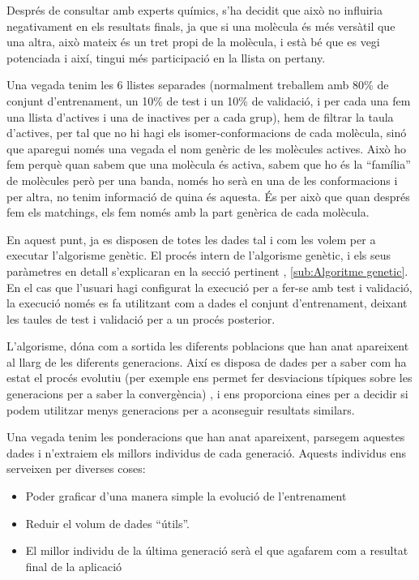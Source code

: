 Després de consultar amb experts químics, s'ha decidit que això no influiria
negativament en els resultats finals, ja que si una molècula és més versàtil que
una altra, això mateix és un tret propi de la molècula, i està bé que es vegi
potenciada i així, tingui més participació en la llista on pertany.

Una vegada tenim les 6 llistes separades (normalment treballem amb 80\% de
conjunt d'entrenament, un 10\% de test i un 10\% de validació, i per cada una
fem una llista d'actives i una de inactives per a cada grup),  hem de filtrar la
taula d'actives, per tal que no hi hagi els  isomer-conformacions de cada
molècula, sinó que aparegui només una vegada el nom genèric de les molècules
actives.  Això ho fem perquè quan sabem que una molècula és activa, sabem que ho
és la ``família'' de molècules però per una banda, només ho serà en una de les
conformacions i per altra, no tenim informació de quina és aquesta.  És per això
que quan després fem els matchings, els fem només amb la part genèrica de cada
molècula.



En aquest punt, ja es disposen de totes les dades tal i com les volem per a
executar l'algorisme genètic.  El procés intern de l'algorisme genètic, i els
seus paràmetres en detall s'explicaran en la secció pertinent ,
\ref{sub:Algoritme genetic}.  En el cas que l'usuari hagi configurat la execució
per a fer-se amb test i validació, la execució només es fa utilitzant com a
dades el conjunt d'entrenament, deixant les taules de test i validació per a
un procés posterior.

L'algorisme, dóna com a sortida les diferents poblacions que han anat apareixent
al llarg de les diferents generacions.  Així es disposa de dades per a saber com
ha estat el procés evolutiu (per exemple ens permet fer desviacions típiques
sobre les generacions per a saber la convergència) , i ens proporciona eines per
a decidir si podem utilitzar menys generacions per a aconseguir resultats
similars.

Una vegada tenim les ponderacions que han anat apareixent, parsegem aquestes
dades i n'extraiem els millors individus de cada generació.  Aquests individus
ens serveixen per diverses coses:

\begin{itemize}
	\item Poder graficar d'una manera simple la evolució de l'entrenament
	\item Reduir el volum de dades ``útils''.
	\item El millor individu de la última generació serà el que agafarem com a
	resultat final de la aplicació
\end{itemize}


